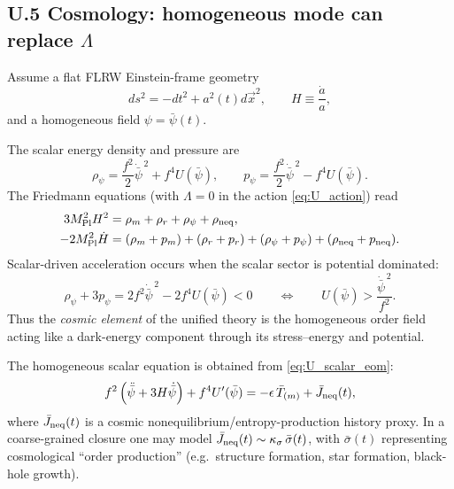 \documentclass[10pt]{article}
\begin{document}
\subsection{U.5 Cosmology: homogeneous mode can replace $\Lambda$}
\label{app:unified:cosmo}

Assume a flat FLRW Einstein-frame geometry
\begin{equation}
ds^2=-dt^2+a^2(t)d\vec x^2,\qquad H\equiv \frac{\dot a}{a},
\end{equation}
and a homogeneous field $\psi=\bar\psi(t)$.

The scalar energy density and pressure are
\begin{equation}
\rho_\psi=\frac{f^2}{2}\dot{\bar\psi}^{\,2}+f^4U(\bar\psi),
\qquad
p_\psi=\frac{f^2}{2}\dot{\bar\psi}^{\,2}-f^4U(\bar\psi).
\label{eq:U_rho_p_psi}
\end{equation}
The Friedmann equations (with $\Lambda=0$ in the action \eqref{eq:U_action}) read
\begin{align}
3M_{\rm Pl}^2H^2 &= \rho_m+\rho_r+\rho_\psi+\rho_{\rm neq},
\label{eq:U_friedmann1}\\
-2M_{\rm Pl}^2\dot H &= (\rho_m+p_m)+(\rho_r+p_r)+(\rho_\psi+p_\psi)+(\rho_{\rm neq}+p_{\rm neq}).
\label{eq:U_friedmann2}
\end{align}
Scalar-driven acceleration occurs when the scalar sector is potential dominated:
\begin{equation}
\rho_\psi+3p_\psi = 2f^2\dot{\bar\psi}^{\,2}-2f^4U(\bar\psi) <0
\qquad\Longleftrightarrow\qquad
U(\bar\psi)>\frac{\dot{\bar\psi}^{\,2}}{f^2}.
\label{eq:U_accel_condition}
\end{equation}
Thus the \emph{cosmic element} of the unified theory is the homogeneous order field acting like a dark-energy component
through its stress--energy and potential.

The homogeneous scalar equation is obtained from \eqref{eq:U_scalar_eom}:
\begin{equation}
f^2\left(\ddot{\bar\psi}+3H\dot{\bar\psi}\right)+f^4U'(\bar\psi)
=
-\epsilon\,\bar T_{(m)} + \bar J_{\rm neq}(t),
\label{eq:U_background_scalar}
\end{equation}
where $\bar J_{\rm neq}(t)$ is a cosmic nonequilibrium/entropy-production history proxy.
In a coarse-grained closure one may model $\bar J_{\rm neq}(t)\sim \kappa_\sigma\,\bar\sigma(t)$,
with $\bar\sigma(t)$ representing cosmological ``order production'' (e.g.\ structure formation, star formation, black-hole growth).
\end{document}
